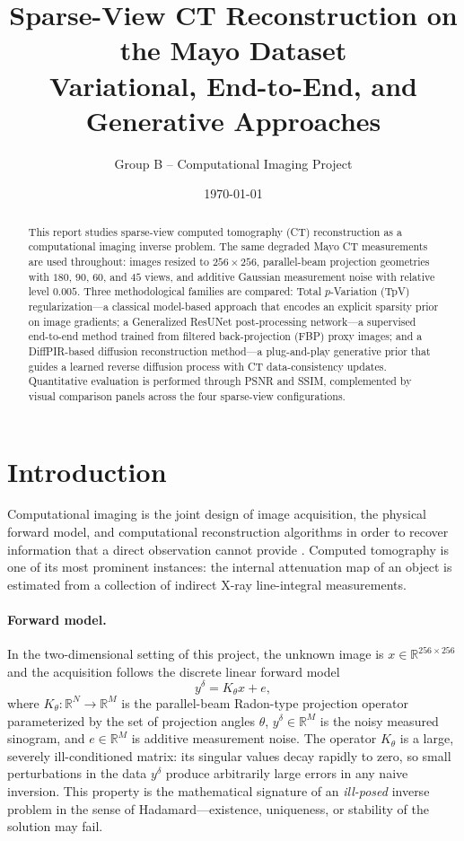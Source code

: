 \documentclass[11pt,a4paper]{article}
\title{\textbf{Sparse-View CT Reconstruction on the Mayo Dataset}\\
\large Variational, End-to-End, and Generative Approaches}
\author{Group B -- Computational Imaging Project}
\date{\today}
\begin{document}
\maketitle

\begin{abstract}
This report studies sparse-view computed tomography (CT) reconstruction as a
computational imaging inverse problem. The same degraded Mayo CT measurements
are used throughout: images resized to $256\times256$, parallel-beam projection
geometries with $180$, $90$, $60$, and $45$ views, and additive Gaussian
measurement noise with relative level $0.005$. Three methodological families are
compared: Total $p$-Variation (TpV) regularization---a classical model-based
approach that encodes an explicit sparsity prior on image gradients; a
Generalized ResUNet post-processing network---a supervised end-to-end method
trained from filtered back-projection (FBP) proxy images; and a DiffPIR-based
diffusion reconstruction method---a plug-and-play generative prior that guides a
learned reverse diffusion process with CT data-consistency updates. Quantitative
evaluation is performed through PSNR and SSIM, complemented by visual comparison
panels across the four sparse-view configurations.
\end{abstract}

\section{Introduction}

Computational imaging is the joint design of image acquisition, the physical
forward model, and computational reconstruction algorithms in order to recover
information that a direct observation cannot provide
\cite{mccollough2016lowdose}. Computed tomography is one of its most prominent
instances: the internal attenuation map of an object is estimated from a
collection of indirect X-ray line-integral measurements.

\paragraph{Forward model.}
In the two-dimensional setting of this project, the unknown image is
$x\in\mathbb{R}^{256\times256}$ and the acquisition follows the discrete
linear forward model
\begin{equation}
  y^{\delta} = K_\theta x + e,
  \label{eq:ct-forward-model}
\end{equation}
where $K_\theta:\mathbb{R}^{N}\to\mathbb{R}^{M}$ is the parallel-beam
Radon-type projection operator parameterized by the set of projection angles
$\theta$, $y^{\delta}\in\mathbb{R}^{M}$ is the noisy measured sinogram, and
$e\in\mathbb{R}^{M}$ is additive measurement noise. The operator $K_\theta$
is a large, severely ill-conditioned matrix: its singular values decay rapidly
to zero, so small perturbations in the data $y^{\delta}$ produce arbitrarily
large errors in any naive inversion. This property is the mathematical signature
of an \emph{ill-posed} inverse problem in the sense of Hadamard---existence,
uniqueness, or stability of the solution may fail.
\end{document}
